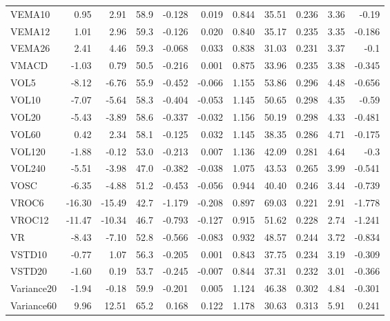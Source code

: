 \documentclass[preprint,12pt]{elsarticle}
\begin{document}
{\begin{longtable}{lrrrrrrrrrr}
    VEMA10 &   0.95 &  2.91 &   58.9 &   -0.128 & 0.019 & 0.844 &     35.51 & 0.236 & 3.36 &-0.19  \\
    VEMA12 &   1.01 &  2.96 &   59.3 &   -0.126 & 0.020 & 0.840 &     35.17 & 0.235 & 3.35 & -0.186  \\
    VEMA26 &   2.41 &  4.46 &   59.3 &   -0.068 & 0.033 & 0.838 &     31.03 & 0.231 & 3.37& -0.1  \\
    VMACD &   -1.03 &  0.79 &   50.5 &   -0.216 & 0.001 & 0.875 &     33.96 & 0.235 & 3.38 & -0.345 \\
    VOL5 &   -8.12 &  -6.76 &   55.9 &   -0.452 & -0.066 & 1.155 &     53.86 & 0.296 & 4.48 & -0.656  \\
    VOL10 &   -7.07 &  -5.64 &   58.3 &   -0.404 & -0.053 & 1.145 &     50.65 & 0.298 & 4.35 & -0.59 \\
    VOL20 &   -5.43 &  -3.89 &   58.6 &   -0.337 & -0.032 & 1.156 &     50.19 & 0.298 & 4.33&  -0.481 \\
    VOL60 &   0.42 &  2.34 &   58.1 &   -0.125 & 0.032 & 1.145 &     38.35 & 0.286 & 4.71 & -0.175 \\
    VOL120 &   -1.88 &  -0.12 &   53.0 &   -0.213 & 0.007 & 1.136 &     42.09 & 0.281 & 4.64 & -0.3 \\
    VOL240 &   -5.51 &  -3.98 &   47.0 &   -0.382 & -0.038 & 1.075 &     43.53 & 0.265 & 3.99 &  -0.541\\
    VOSC &   -6.35 &  -4.88 &   51.2 &   -0.453 & -0.056 & 0.944 &     40.40 & 0.246 & 3.44 &  -0.739 \\
    VROC6 &   -16.30 &  -15.49 &   42.7 &   -1.179 & -0.208 & 0.897 &     69.03 & 0.221 & 2.91 & -1.778  \\
    VROC12 &   -11.47 &  -10.34 &   46.7 &   -0.793 & -0.127 & 0.915 &     51.62 & 0.228 & 2.74 & -1.241 \\
    VR &   -8.43 &  -7.10 &   52.8 &   -0.566 & -0.083 & 0.932 &     48.57 & 0.244 & 3.72 &  -0.834 \\
    VSTD10 &   -0.77 &  1.07 &   56.3 &   -0.205 & 0.001 & 0.843 &     37.75 & 0.234 & 3.19 &  -0.309 \\
    VSTD20 &   -1.60 &  0.19 &   53.7 &   -0.245 & -0.007 & 0.844 &     37.31 & 0.232 & 3.01 &  -0.366 \\
    Variance20 &   -1.94 &  -0.18 &   59.9 &   -0.201 & 0.005 & 1.124 &     46.38 & 0.302 & 4.84 &  -0.301 \\
    Variance60 &   9.96 &  12.51 &   65.2 &   0.168 & 0.122 & 1.178 &     30.63 & 0.313 & 5.91 & 0.241  \\

\end{longtable}}
\end{document}

